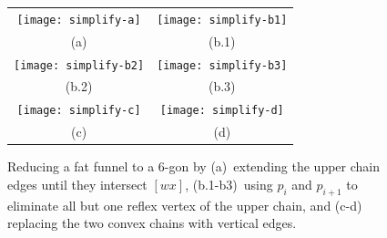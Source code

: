 \documentclass[charterfonts,lotsofwhite]{patmorin}
\newcommand{\chain}[2]{[#1#2]}
\begin{document}
\begin{figure}[htbp]
\begin{center}\begin{tabular}{c@{\hspace{2cm}}c}
\texttt{[image: simplify-a]} & \texttt{[image: simplify-b1]} \\
(a) & (b.1)  \\
\texttt{[image: simplify-b2]} & \texttt{[image: simplify-b3]} \\
(b.2) & (b.3)  \\
\texttt{[image: simplify-c]} & \texttt{[image: simplify-d]} \\
(c) & (d) 
\end{tabular}\end{center}
\caption{Reducing a fat funnel to a 6-gon by
(a)~extending the upper chain edges until they intersect $\chain{w}{x}$,
(b.1-b3)~using $p_i$ and $p_{i+1}$ to eliminate all but one reflex
vertex of the upper chain, and (c-d) replacing the two convex chains with
vertical edges.}
\end{figure}
\end{document}
